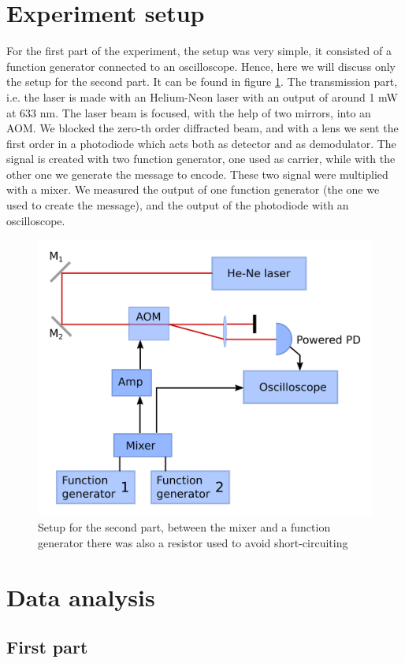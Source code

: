 \documentclass[a4paper,10pt]{article}
\begin{document}
\section{Experiment setup}
For the first part of the experiment, the setup was very simple, it consisted of a function generator connected to an oscilloscope. Hence, here we will discuss only the setup for the second part. It can be found in figure \ref{setup}. The transmission part, i.e. the laser is made with an Helium-Neon laser with an output of around 1 mW at 633 nm. The laser beam is focused, with the help of two mirrors, into an AOM. We blocked the zero-th order diffracted beam, and with a lens we sent the first order in a photodiode which acts both as detector and as demodulator. The signal is created with two function generator, one used as carrier, while with the other one we generate the message to encode. These two signal were multiplied with a mixer. We measured the output of one function generator (the one we used to create the message), and the output of the photodiode with an oscilloscope.
\begin{figure}[H]
\centering
\includegraphics[width=.8\textwidth]{setup}
\caption{Setup for the second part, between the mixer and a function generator there was also a resistor used to avoid short-circuiting}\label{setup}
\end{figure}
\section{Data analysis}
\subsection{First part}
\end{document}
